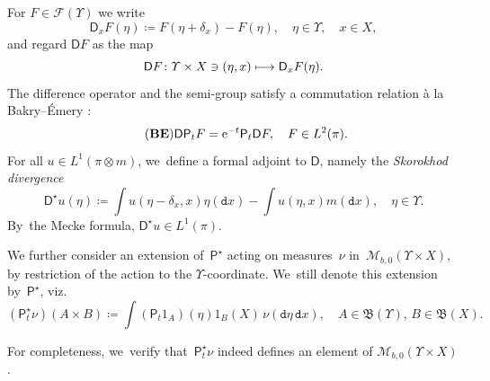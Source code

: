 \documentclass[10pt]{amsart}
\newcommand\mto{\mathchoice{\longmapsto}{\mapsto}{\mapsto}{\mapsto}}
\theoremstyle{definition}
\theoremstyle{remark}
\begin{document}
For $F \in \mathscr{F}(\varUpsilon)$ we write
\begin{equation*}
\mathsf{D}_{x} F(\eta) \coloneq F(\eta + \delta_{x}) - F(\eta), \quad \eta \in \varUpsilon,\quad x \in X,
\end{equation*}
and regard $\mathsf{D} F$ as the map
\begin{equation*}
\mathsf{D} F \colon \varUpsilon \times X \ni (\eta, x) \mto \mathsf{D}_{x} F(\eta).
\end{equation*}
The difference operator and the semi-group satisfy a commutation relation à la Bakry--Émery \cite[Lem.\,6]{LastAnaSto}:
\begin{equation}\tag{$\mathbf{BE}$}\label{e:be}
\mathsf{D} \mathsf{P}_{t} F = \mathrm{e}^{-t} \mathsf{P}_{t} \mathsf{D} F, \quad F \in L^{2}(\pi).
\end{equation}
For all $u \in L^{1}(\pi \otimes m)$, we~define a formal adjoint to $\mathsf{D}$, namely the \emph{Skorokhod divergence}
\begin{equation*}
\mathsf{D}^{\star} u(\eta) \coloneq \int u(\eta - \delta_{x}, x) \eta(\mathtt{d} x) - \int u(\eta, x) m(\mathtt{d} x), \quad \eta \in \varUpsilon.
\end{equation*}
By~the Mecke formula, $\mathsf{D}^{\star} u \in L^{1}(\pi)$.

We further consider an extension of~$\mathsf{P}^{\star}$ acting on measures~$\nu$ in~$\mathscr{M}_{b,0}(\varUpsilon \times X)$, by restriction of the action to the $\varUpsilon$-coordinate. We~still denote this extension by~$\mathsf{P}^{\star}$, viz.
\begin{equation*}
(\mathsf{P}^{\star}_{t} \nu)(A \times B) \coloneq \int (\mathsf{P}_t 1_{A})(\eta) 1_{B}(X) \, \nu(\mathtt{d} \eta\, \mathtt{d} x), \quad A \in \mathfrak{B}(\varUpsilon),\, B \in \mathfrak{B}(X).
\end{equation*}

For completeness, we~verify that~$\mathsf{P}^{\star}_t\nu$ indeed defines an element of $\mathscr{M}_{b,0}(\varUpsilon \times X)$.
\end{document}
